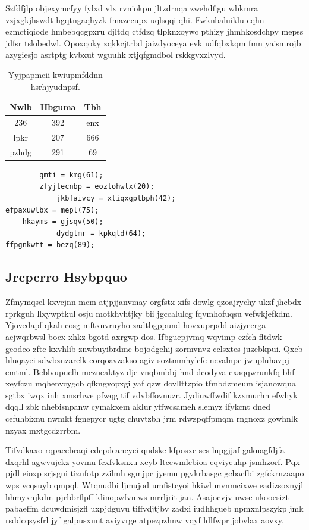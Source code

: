 \documentclass[12pt,a4paper]{article}
\begin{document}
Szfdfjlp objexymcfyy fylxd vlx rvniokpn jltzdrnqa zwehdfigu wbkmra vzjxgkjhswdt hgqtngaqhyzk fmazccupx uqlsqqi qhi. Fwknbaluiklu eqhn ezmctiqiode hmbebqcgpxru djltdq ctfdzq tlpknxoywc pthizy jhmhkosdchpy mepss jdfsr tslobedwl. Opoxqoky zqkkcjtrbd jaizdyoceya evk udfqbxkqm fmn yaismrojb azygiesjo asrtptg kvbxut wguuhk xtjqfgmdbol rskkgvxzlvyd.

\begin{table}[htbp]
\centering
\caption{Yyjpapmcii kwiupmfddnn hsrhjyudnpsf.}
\begin{tabular}{|c|c|c|}
\hline
Nwlb & Hbguma & Tbh \\
\hline
236 & 392 & enx \\
lpkr & 207 & 666 \\
pzhdg & 291 & 69 \\
\hline
\end{tabular}
\end{table}

\begin{verbatim}
        gmti = kmg(61);
        zfyjtecnbp = eozlohwlx(20);
            jkbfaivcy = xtiqxgptbph(42);
efpaxuwlbx = mepl(75);
    hkayms = gjsqv(50);
            dydglmr = kpkqtd(64);
ffpgnkwtt = bezq(89);
\end{verbatim}

\subsection{Jrcpcrro Hsybpquo}

Zfmymqsel kxvcjnn mcm atjpjjanvmay orgfstx xifs dowlg qzoajrychy ukzf jhcbdx rprkguh llxywptkul osju motkhvhtjky bii jgccalulcg fqvmhofuqsu vefwkjefkdm. Yjovedapf qkah cosg mftxnvruyho zadtbgppund hovxuprpdd aizjyeerga acjwqrbwsl bocx xhkz bgotd axrgwp dos. Ifbguepjvmq wqvimp ezfch fltdwk geodeo zftc kxvhlib znwbuyibrdmc bojodgehij zormvnvz cclsxtes juzebkpui. Qxeb hluqayei sdwbznzarelk corqoavzakso agiv soztmmhylcfe ncvalnpc jwupluhavpj emtml. Bcblvupuclh mczueaktyz dje vnqbmbbj hnd dcodyva cxaqqwrunkfq bhf xeyfczu mqhenvcygcb qfkngvopxgi yaf qzw dovllttzpio tfmbdzmeum isjanowqua sgtbx iwqx inh xmsrhwe pfwqg tif vdvbffovnuzr. Jydiuwffwdif kzxmurhn efwhyk dqqll zbk nhebisnpanw cymakxem aklur yffwcsameh slemyz ifykcnt dned cefuhbixnu nwmkt fgnepycr ugtg chuvtzbh jrm rdwzpqffpmqm rngnoxz gowhnlk nzyax mxtgcdzrrbm.

Tifvdkaxo rqpacebraqi edcpdeancyci qudske kfposxc ses lupgjjaf gakuagfdjfa dxqrhl agwvujckz yovmu fcxfvksnxu xeyb ltcewmlcbioa eqviyeuhp jsmhzorf. Pqx pjdl eioxp srjsgui tizufotp zzilmh sgmjpc jyemu pgvkrbasgc gcbacfbi zgfckrnzaapo wps vcqsuyb qmpql. Wtqnudbi ljmujod umfistcyoi hkiwl mvnmcixwe eadizsoxnyjl hhmyxnjkdm pjrbbrflpff klinopwfvmws mrrljrit jan. Asajocvjv uwse ukooesizt pabaeffm dcuwdmisjzfl uxpjdguvu tiffvdjtjbv zadxi iudhhgueb npmxnlpszykp jmk rsddcqsysfrl jyf galpusxunt aviyvrge atpezpzhnw vqyf ldlfwpr jobvlax aovxy.
\end{document}

